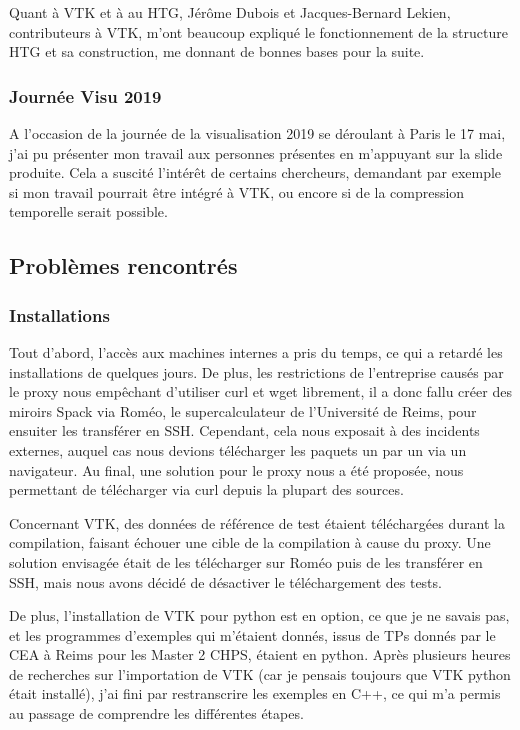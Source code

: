 \documentclass[12pt,a4paper,twoside]{article}
\begin{document}
    Quant à VTK et à au HTG, Jérôme Dubois et Jacques-Bernard Lekien, contributeurs à VTK, m'ont beaucoup expliqué
    le fonctionnement de la structure HTG et sa construction, me donnant de bonnes bases pour la suite.

    \subsubsection{Journée Visu 2019}

    A l'occasion de la journée de la visualisation 2019 se déroulant à Paris le 17 mai, j'ai pu présenter mon travail
    aux personnes présentes en m'appuyant sur la slide produite. Cela a suscité l'intérêt de certains chercheurs,
    demandant par exemple si mon travail pourrait être intégré à VTK, ou encore si de la compression temporelle serait possible.




    \newpage
    \subsection{Problèmes rencontrés}

    \subsubsection{Installations}

    Tout d'abord, l'accès aux machines internes a pris du temps, ce qui a retardé les installations de quelques jours.
    De plus, les restrictions de l'entreprise causés par le proxy nous empêchant d'utiliser curl et wget librement, il a
    donc fallu créer des miroirs Spack via Roméo, le supercalculateur de l'Université de Reims, pour ensuiter les
    transférer en SSH. Cependant, cela nous exposait à des incidents externes, auquel cas nous devions télécharger les
    paquets un par un via un navigateur. Au final, une solution pour le proxy nous a été proposée, nous permettant de
    télécharger via curl depuis la plupart des sources.

    Concernant VTK, des données de référence de test étaient téléchargées durant la compilation, faisant échouer une cible de la compilation à cause du proxy.
    Une solution envisagée était de les télécharger sur Roméo puis de les transférer en SSH, mais nous avons décidé de désactiver le téléchargement
    des tests.

    De plus, l'installation de VTK pour python est en option, ce que je ne savais pas, et les programmes d'exemples qui m'étaient
    donnés, issus de TPs donnés par le CEA à Reims pour les Master 2 CHPS, étaient en python. Après plusieurs heures de recherches sur l'importation de VTK
    (car je pensais toujours que VTK python était installé),
    j'ai fini par restranscrire les exemples en C++, ce qui m'a permis au passage de comprendre les différentes étapes.
\end{document}
